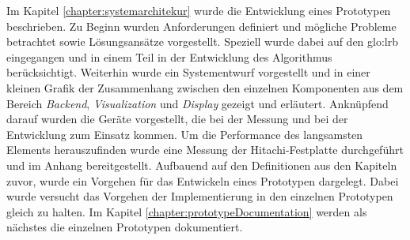 Im Kapitel \ref{chapter:systemarchitekur} wurde die Entwicklung eines Prototypen beschrieben. Zu Beginn wurden Anforderungen definiert und mögliche Probleme betrachtet sowie Lösungsansätze vorgestellt. Speziell wurde dabei auf den \gls{glo:lrb} eingegangen und in einem Teil in der Entwicklung des Algorithmus berücksichtigt. Weiterhin wurde ein Systementwurf vorgestellt und in einer kleinen Grafik der Zusammenhang zwischen den einzelnen Komponenten aus dem Bereich \textit{Backend}, \textit{Visualization} und \textit{Display} gezeigt und erläutert. Anknüpfend darauf wurden die Geräte vorgestellt, die bei der Messung und bei der Entwicklung zum Einsatz kommen. Um die Performance des langsamsten Elements herauszufinden wurde eine Messung der Hitachi-Festplatte durchgeführt und im Anhang bereitgestellt. Aufbauend auf den Definitionen aus den Kapiteln zuvor, wurde ein Vorgehen für das Entwickeln eines Prototypen dargelegt. Dabei wurde versucht das Vorgehen der Implementierung in den einzelnen Prototypen gleich zu halten. Im Kapitel \ref{chapter:prototypeDocumentation} werden als nächstes die einzelnen Prototypen dokumentiert.